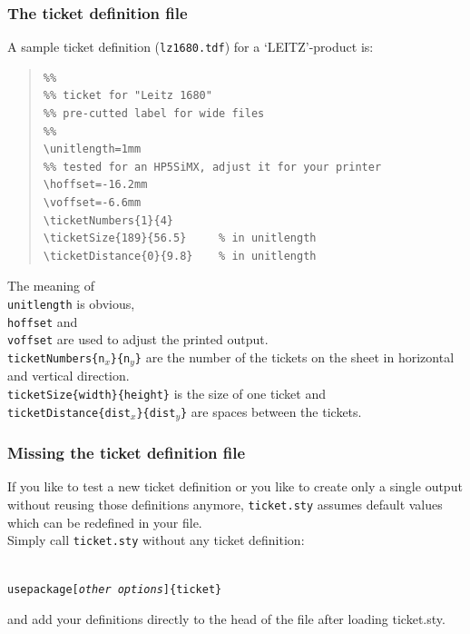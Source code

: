 \documentclass[aspectratio=1610,hyperref={pdfpagelabels=false}]{beamer}
\def\code#1{\texttt{#1}}
\newcommand{\ticket}{{\code{ticket.sty}}}
\newcommand{\bs}{{\mtt\\}}
\begin{document}
\begin{frame}[fragile]
  \frametitle{The ticket definition file}\hypertarget{tdf}{}
A sample ticket definition (\code{lz1680.tdf}) for a \lq{}LEITZ\rq{}-product is:\\
\begin{quote}
  \begin{minipage}[t]{0.5\textwidth}
    {\scriptsize
\begin{verbatim}
%%
%% ticket for "Leitz 1680" 
%% pre-cutted label for wide files
%%
\unitlength=1mm
%% tested for an HP5SiMX, adjust it for your printer
\hoffset=-16.2mm
\voffset=-6.6mm
\ticketNumbers{1}{4}
\ticketSize{189}{56.5}     % in unitlength
\ticketDistance{0}{9.8}    % in unitlength
\end{verbatim}
      }
    \end{minipage}
\end{quote}
The meaning of \code{\bs{}unitlength} is obvious, \code{\bs{}hoffset} and 
\code{\bs{}voffset} are used to adjust the printed output.
\code{\bs{}ticketNumbers\{n$_x$\}\{n$_y$\}} are the number of the tickets
on the sheet in horizontal and vertical direction.
\code{\bs{}ticketSize\{width\}\{height\}} is the size of one ticket and
\code{\bs{}ticketDistance\{dist$_x$\}\{dist$_y$\}} are spaces
between the tickets.
\end{frame}
\begin{frame}
  \frametitle{Missing the ticket definition file}
If you like to test a new ticket definition or you like to create only a single output without reusing those definitions anymore, \ticket{} assumes default values which can be
redefined in your file.\\
Simply call \ticket{} without any ticket definition:

\code{\bs{}usepackage[{\itshape other options}]\{ticket\}}

and add your definitions directly to the head of the file after loading ticket.sty.
\end{frame}
\end{document}

